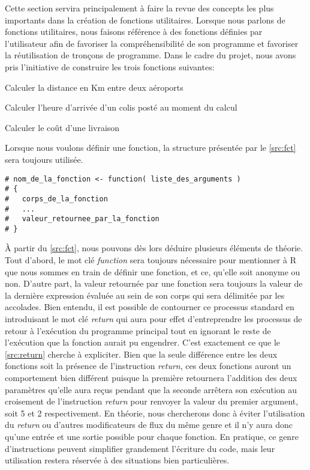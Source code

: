 Cette section servira principalement à faire la revue des concepts les plus importants dans la création de fonctions utilitaires. Lorsque nous parlons de fonctions utilitaires, nous faisons référence à des fonctions définies par l'utilisateur afin de favoriser la compréhensibilité de son programme et favoriser la réutilisation de tronçons de programme. Dans le cadre du projet, nous avons pris l'initiative de construire les trois fonctions suivantes: \\
\begin{description}[style=multiline,leftmargin=2.5cm]
	\item[airportsDist] Calculer la distance en Km entre deux aéroports
	\item[arrivalTime] Calculer l'heure d'arrivée d'un colis posté au moment du calcul
	\item[shippingCost] Calculer le coût d'une livraison
\end{description}

\noindent
Lorsque nous voulons définir une fonction, la structure présentée par le \autoref{src:fct} sera toujours utilisée. 

\begin{lstlisting}[caption = Structure pour la définition d'une fonction,label=src:fct]
# nom_de_la_fonction <- function( liste_des_arguments )
# {
# 	corps_de_la_fonction
# 	... 
# 	valeur_retournee_par_la_fonction
# }
\end{lstlisting}

\vspace{\baselineskip}
\noindent
À partir du \autoref{src:fct}, nous pouvons dès lors déduire plusieurs éléments de théorie. Tout d'abord, le mot clé \emph{function} sera toujours nécessaire pour mentionner à R que nous sommes en train de définir une fonction, et ce, qu'elle soit anonyme ou non. D'autre part, la valeur retournée par une fonction sera toujours la valeur de la dernière expression évaluée au sein de son corps qui sera délimitée par les accolades. Bien entendu, il est possible de contourner ce processus standard en introduisant le mot clé \emph{return} qui aura pour effet d'entreprendre les processus de retour à l'exécution du programme principal tout en ignorant le reste de l'exécution que la fonction aurait pu engendrer. C'est exactement ce que le \autoref{src:return} cherche à expliciter. Bien que la seule différence entre les deux fonctions soit la présence de l'instruction \emph{return}, ces deux fonctions auront un comportement bien différent puisque la première retournera l'addition des deux paramètres qu'elle aura reçus pendant que la seconde arrêtera son exécution au croisement de l'instruction \emph{return} pour renvoyer la valeur du premier argument, soit 5 et 2 respectivement. En théorie, nous chercherons donc à éviter l'utilisation du \emph{return} ou d'autres modificateurs de flux du même genre et il n'y aura donc qu'une entrée et une sortie possible pour chaque fonction. En pratique, ce genre d'instructions peuvent simplifier grandement l'écriture du code, mais leur utilisation restera réservée à des situations bien particulières.

